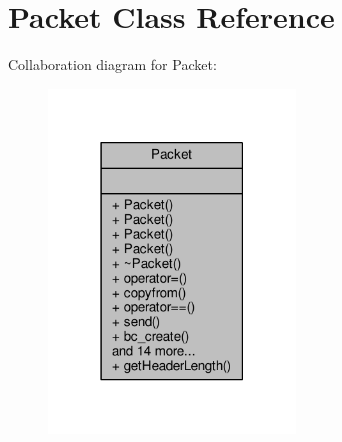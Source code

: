 \hypertarget{classPacket}{}\section{Packet Class Reference}
\label{classPacket}


Collaboration diagram for Packet\+:
\nopagebreak
\begin{figure}[H]
\begin{center}
\leavevmode
\includegraphics[width=186pt]{dc/ddd/classPacket__coll__graph}
\end{center}
\end{figure}
